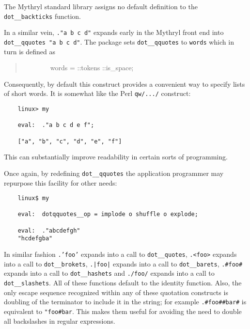 The Mythryl standard library assigns no default definition to 
the {\tt dot\_\_backticks} function.

In a similar vein, {\tt ."a b c d"} expands early in the Mythryl front 
end into {\tt dot\_\_qquotes "a b c d"}. 
The   
package sets {\tt dot\_\_qquotes} to {\tt words} which in turn is defined as

\begin{quotation}
~~~~~~~~words  = ::tokens ::is\_space;
\end{quotation}

Consequently, by default this construct provides a convenient way 
to specify lists of short words.  It is somewhat like the Perl 
{\tt qw/.../} construct:

\begin{verbatim}
    linux> my

    eval:  ."a b c d e f";

    ["a", "b", "c", "d", "e", "f"]
\end{verbatim}

This can substantially improve readability in certain sorts of programming. 

Once again, by redefining {\tt dot\_\_qquotes} the application programmer may repurpose 
this facility for other needs:

\begin{verbatim}
    linux$ my

    eval:  dotqquotes__op = implode o shuffle o explode;

    eval:  ."abcdefgh"
    "hcdefgba"
\end{verbatim}

In similar fashion 
{\tt .'foo'} expands into a call to {\tt dot\_\_quotes}, 
{\tt .<foo>} expands into a call to {\tt dot\_\_brokets}, 
{\tt .|foo|} expands into a call to {\tt dot\_\_barets}, {\tt .#foo#} expands 
into a call to {\tt dot\_\_hashets} and {\tt ./foo/} expands into a call to 
{\tt dot\_\_slashets}.  All of these functions default to the identity function. 
Also, the only escape sequence recognized within any of these quotation constructs 
is doubling of the terminator to include it in the string; for example {\tt .#foo##bar#} 
is equivalent to {\tt "foo#bar}.  This makes them useful for avoiding the need to 
double all backslashes in regular expressions.

\cutend*


